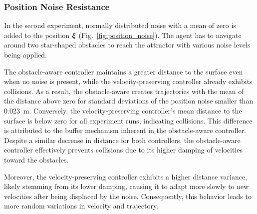 \subsubsection{Position Noise Resistance} \label{sec:position_noise}
In the second experiment, normally distributed noise with a mean of zero is added to the position $\boldsymbol{ \xi}$ (Fig.~\ref{fig:position_noise}). The agent has to navigate around two star-shaped obstacles to reach the attractor with various noise levels being applied.

The obstacle-aware controller maintains a greater distance to the surface even when no noise is present, while the velocity-preserving controller already exhibits collisions. As a result, the obstacle-aware creates trajectories with the mean of the distance above zero for standard deviations of the position noise smaller than \qty{0.023}{m}. Conversely, the velocity-preserving controller's mean distance to the surface is below zero for all experiment runs, indicating collisions.
This difference is attributed to the buffer mechanism inherent in the obstacle-aware controller. Despite a similar decrease in distance for both controllers, the obstacle-aware controller effectively prevents collisions due to its higher damping of velocities toward the obstacles.

Moreover, the velocity-preserving controller exhibits a higher distance variance, likely stemming from its lower damping, causing it to adapt more slowly to new velocities after being displaced by the noise. Consequently, this behavior leads to more random variations in velocity and trajectory.

